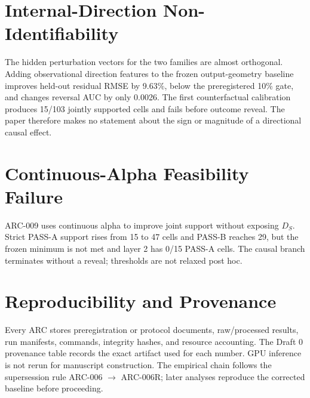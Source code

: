 \section{Internal-Direction Non-Identifiability}
\label{app:direction}

The hidden perturbation vectors for the two families are almost orthogonal.
Adding observational direction features to the frozen output-geometry baseline
improves held-out residual RMSE by 9.63\%, below the preregistered 10\% gate,
and changes reversal AUC by only 0.0026. The first counterfactual calibration
produces 15/103 jointly supported cells and fails before outcome reveal. The
paper therefore makes no statement about the sign or magnitude of a directional
causal effect.

\section{Continuous-Alpha Feasibility Failure}

ARC-009 uses continuous alpha to improve joint support without exposing
$D_S$. Strict PASS-A support rises from 15 to 47 cells and PASS-B reaches 29,
but the frozen minimum is not met and layer 2 has 0/15 PASS-A cells. The causal
branch terminates without a reveal; thresholds are not relaxed post hoc.

\section{Reproducibility and Provenance}

Every ARC stores preregistration or protocol documents, raw/processed results,
run manifests, commands, integrity hashes, and resource accounting. The Draft 0
provenance table records the exact artifact used for each number. GPU inference
is not rerun for manuscript construction. The empirical chain follows the
supersession rule ARC-006 $\rightarrow$ ARC-006R; later analyses reproduce the
corrected baseline before proceeding.
